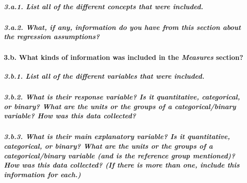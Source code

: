 \documentclass[]{article}
\let\oldparagraph\paragraph
\renewcommand{\paragraph}[1]{\oldparagraph{#1}\mbox{}}
\let\oldsubparagraph\subparagraph
\renewcommand{\subparagraph}[1]{\oldsubparagraph{#1}\mbox{}}
\begin{document}
\hypertarget{a.1.-list-all-of-the-different-concepts-that-were-included.}{%
\subparagraph{3.a.1. List all of the different concepts that were
included.}\label{a.1.-list-all-of-the-different-concepts-that-were-included.}}

\hypertarget{a.2.-what-if-any-information-do-you-have-from-this-section-about-the-regression-assumptions}{%
\subparagraph{3.a.2. What, if any, information do you have from this
section about the regression
assumptions?}\label{a.2.-what-if-any-information-do-you-have-from-this-section-about-the-regression-assumptions}}

\hypertarget{b.-what-kinds-of-information-was-included-in-the-measures-section}{%
\paragraph{\texorpdfstring{3.b. What kinds of information was included
in the \emph{Measures}
section?}{3.b. What kinds of information was included in the Measures section?}}\label{b.-what-kinds-of-information-was-included-in-the-measures-section}}

\hypertarget{b.1.-list-all-of-the-different-variables-that-were-included.}{%
\subparagraph{3.b.1. List all of the different variables that were
included.}\label{b.1.-list-all-of-the-different-variables-that-were-included.}}

\hypertarget{b.2.-what-is-their-response-variable-is-it-quantitative-categorical-or-binary-what-are-the-units-or-the-groups-of-a-categoricalbinary-variable-how-was-this-data-collected}{%
\subparagraph{3.b.2. What is their response variable? Is it
quantitative, categorical, or binary? What are the units or the groups
of a categorical/binary variable? How was this data
collected?}\label{b.2.-what-is-their-response-variable-is-it-quantitative-categorical-or-binary-what-are-the-units-or-the-groups-of-a-categoricalbinary-variable-how-was-this-data-collected}}

\hypertarget{b.3.-what-is-their-main-explanatory-variable-is-it-quantitative-categorical-or-binary-what-are-the-units-or-the-groups-of-a-categoricalbinary-variable-and-is-the-reference-group-mentioned-how-was-this-data-collected-if-there-is-more-than-one-include-this-information-for-each.}{%
\subparagraph{3.b.3. What is their main explanatory variable? Is it
quantitative, categorical, or binary? What are the units or the groups
of a categorical/binary variable (and is the reference group mentioned)?
How was this data collected? (If there is more than one, include this
information for
each.)}\label{b.3.-what-is-their-main-explanatory-variable-is-it-quantitative-categorical-or-binary-what-are-the-units-or-the-groups-of-a-categoricalbinary-variable-and-is-the-reference-group-mentioned-how-was-this-data-collected-if-there-is-more-than-one-include-this-information-for-each.}}
\end{document}

